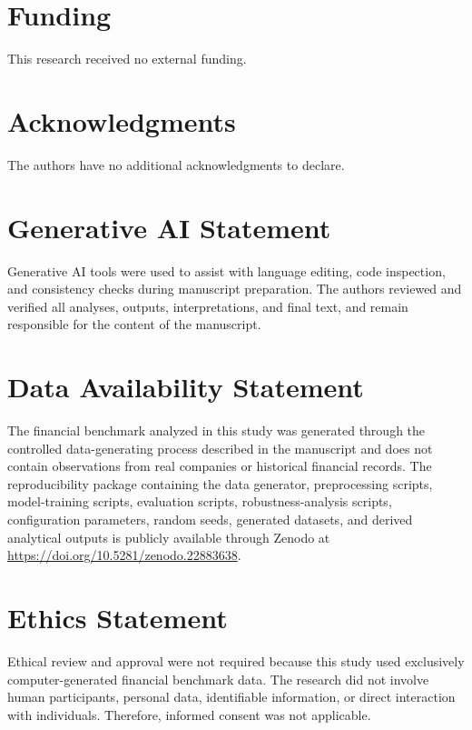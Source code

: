 \documentclass[utf8]{FrontiersinHarvard} %
\newcommand{\rev}[1]{{\color{red}#1}}
\begin{document}
\section*{Funding}

This research received no external funding.

\section*{Acknowledgments}

The authors have no additional acknowledgments to declare.

\section*{Generative AI Statement}

\rev{Generative AI tools were used to assist with language editing, code inspection, and consistency checks during manuscript preparation. The authors reviewed and verified all analyses, outputs, interpretations, and final text, and remain responsible for the content of the manuscript.}

\section*{Data Availability Statement}

The financial benchmark analyzed in this study was generated through the controlled data-generating process described in the manuscript and does not contain observations from real companies or historical financial records. \rev{The reproducibility package containing the data generator, preprocessing scripts, model-training scripts, evaluation scripts, robustness-analysis scripts, configuration parameters, random seeds, generated datasets, and derived analytical outputs is publicly available through Zenodo at \url{https://doi.org/10.5281/zenodo.22883638}.}

\section*{Ethics Statement}

Ethical review and approval were not required because this study used exclusively computer-generated financial benchmark data. The research did not involve human participants, personal data, identifiable information, or direct interaction with individuals. Therefore, informed consent was not applicable.
\end{document}

